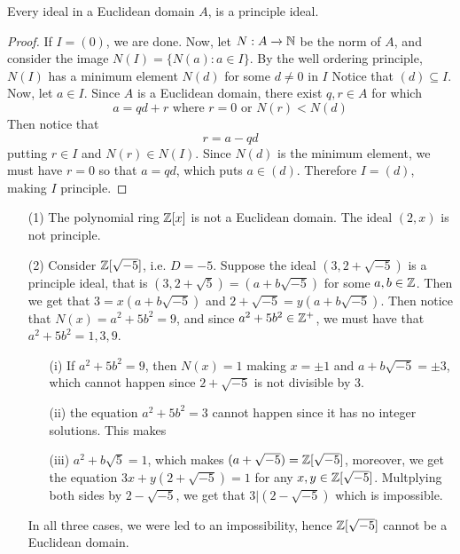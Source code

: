 \begin{lemma}\label{2.1.1}
    Every ideal in a Euclidean domain $A$, is a principle ideal.
\end{lemma}
\begin{proof}
    If $I=(0)$, we are done. Now, let $N:A \xrightarrow{} \mathbb{N}$ be the norm of $A$,
    and consider the image $N(I)=\{N(a) : a \in I\}$. By the well ordering
    principle, $N(I)$ has a minimum element $N(d)$ for some $d \neq 0$ in  $I$
    Notice that  $(d) \subseteq I$. Now, let $a \in I$. Since $A$ is a Euclidean
    domain, there exist $q,r \in A$ for which
    \begin{equation*}
        a=qd+r \text{ where } r=0 \text{ or } N(r)<N(d)
    \end{equation*}
    Then notice that
    \begin{equation*}
        r=a-qd
    \end{equation*}
    putting $r \in I$ and  $N(r) \in N(I)$. Since $N(d)$ is the minimum element,
    we must have $r=0$ so that  $a=qd$, which puts  $a \in (d)$. Therefore
    $I=(d)$, making $I$ principle.
\end{proof}

\begin{example}\label{2.2}
    \begin{enumerate}
        \item[(1)] The polynomial ring $\mathbb{Z}[x]$ is not a Euclidean domain. The
            ideal $(2,x)$ is not principle.

        \item[(2)] Consider $\mathbb{Z}[\sqrt{-5}]$, i.e. $D=-5$. Suppose the ideal
            $(3,2+\sqrt{-5})$ is a principle ideal, that is
            $(3,2+\sqrt{5})=(a+b\sqrt{-5})$ for some $a,b \in \mathbb{Z}$. Then we get
            that $3=x(a+b\sqrt{-5})$ and $2+\sqrt{-5}=y(a+b\sqrt{-5})$. Then
            notice that $N(x)=a^2+5b^2=9$, and since  $a^2+5b^2 \in \mathbb{Z}^+$, we
            must have that $a^2+5b^2=1,3,9$.
            \begin{enumerate}
            \item[(i)] If $a^2+5b^2=9$, then $N(x)=1$ making $x=\pm 1$ and
                $a+b\sqrt{-5}=\pm3$, which cannot happen since $2+\sqrt{-5}$ is
                not divisible by $3$.

            \item[(ii)] the equation $a^2+5b^2=3$ cannot happen since it has no
                integer solutions. This makes

            \item[(iii)] $a^2+b\sqrt{5}=1$, which makes
                $(a+\sqrt{-5})=\mathbb{Z}[\sqrt{-5}]$, moreover, we get the equation
                $3x+y(2+\sqrt{-5})=1$ for any $x,y \in \mathbb{Z}[\sqrt{-5}]$.
                Multplying both sides by $2-\sqrt{-5}$, we get that
                $3|(2-\sqrt{-5})$ which is impossible.
            \end{enumerate}
            In all three cases, we were led to an impossibility, hence
            $\mathbb{Z}[\sqrt{-5}]$ cannot be a Euclidean domain.
    \end{enumerate}
\end{example}

